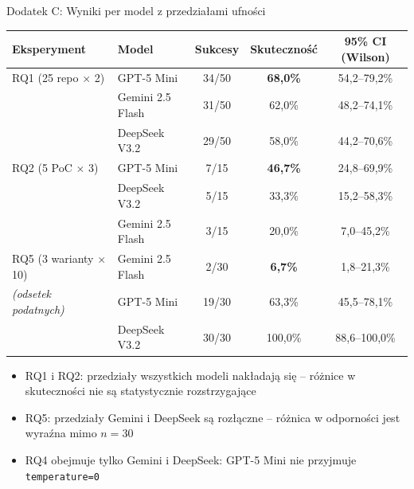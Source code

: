 \documentclass[aspectratio=169]{beamer}
\begin{document}
\begin{frame}{Dodatek C: Wyniki per model z przedziałami ufności}
    \centering
    {\footnotesize
    \begin{tabular}{@{}llccc@{}}
        \toprule
        \textbf{Eksperyment} & \textbf{Model} & \textbf{Sukcesy} & \textbf{Skuteczność} & \textbf{95\% CI (Wilson)} \\
        \midrule
        RQ1 (25 repo $\times$ 2) & GPT-5 Mini & 34/50 & \textbf{68,0\%} & 54,2--79,2\% \\
        & Gemini 2.5 Flash & 31/50 & 62,0\% & 48,2--74,1\% \\
        & DeepSeek V3.2 & 29/50 & 58,0\% & 44,2--70,6\% \\
        \midrule
        RQ2 (5 PoC $\times$ 3) & GPT-5 Mini & 7/15 & \textbf{46,7\%} & 24,8--69,9\% \\
        & DeepSeek V3.2 & 5/15 & 33,3\% & 15,2--58,3\% \\
        & Gemini 2.5 Flash & 3/15 & 20,0\% & 7,0--45,2\% \\
        \midrule
        RQ5 (3 warianty $\times$ 10) & Gemini 2.5 Flash & 2/30 & \textbf{6,7\%} & 1,8--21,3\% \\
        \textit{(odsetek podatnych)} & GPT-5 Mini & 19/30 & 63,3\% & 45,5--78,1\% \\
        & DeepSeek V3.2 & 30/30 & 100,0\% & 88,6--100,0\% \\
        \bottomrule
    \end{tabular}}
    \vspace{0.4em}
    {\footnotesize
    \begin{itemize}
        \item RQ1 i RQ2: przedziały wszystkich modeli nakładają się -- różnice w skuteczności nie są statystycznie rozstrzygające
        \item RQ5: przedziały Gemini i DeepSeek są rozłączne -- różnica w odporności jest wyraźna mimo $n=30$
        \item RQ4 obejmuje tylko Gemini i DeepSeek: GPT-5 Mini nie przyjmuje \texttt{temperature=0}
    \end{itemize}}
\end{frame}
\end{document}
